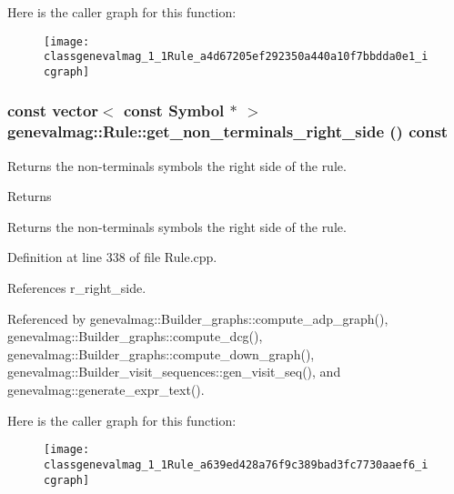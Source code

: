 Here is the caller graph for this function:\nopagebreak
\begin{figure}[H]
\begin{center}
\leavevmode
\texttt{[image: classgenevalmag\_1\_1Rule\_a4d67205ef292350a440a10f7bbdda0e1\_icgraph]}
\end{center}
\end{figure}


\hypertarget{classgenevalmag_1_1Rule_a639ed428a76f9c389bad3fc7730aaef6}{
\subsubsection[{get\_\-non\_\-terminals\_\-right\_\-side}]{\setlength{\rightskip}{0pt plus 5cm}const vector$<$ const {\bf Symbol} $\ast$ $>$ genevalmag::Rule::get\_\-non\_\-terminals\_\-right\_\-side () const}}
\label{classgenevalmag_1_1Rule_a639ed428a76f9c389bad3fc7730aaef6}
Returns the non-\/terminals symbols the right side of the rule. \begin{DoxyReturn}{Returns}

\end{DoxyReturn}
Returns the non-\/terminals symbols the right side of the rule. 

Definition at line 338 of file Rule.cpp.



References r\_\-right\_\-side.



Referenced by genevalmag::Builder\_\-graphs::compute\_\-adp\_\-graph(), genevalmag::Builder\_\-graphs::compute\_\-dcg(), genevalmag::Builder\_\-graphs::compute\_\-down\_\-graph(), genevalmag::Builder\_\-visit\_\-sequences::gen\_\-visit\_\-seq(), and genevalmag::generate\_\-expr\_\-text().



Here is the caller graph for this function:\nopagebreak
\begin{figure}[H]
\begin{center}
\leavevmode
\texttt{[image: classgenevalmag\_1\_1Rule\_a639ed428a76f9c389bad3fc7730aaef6\_icgraph]}
\end{center}
\end{figure}



